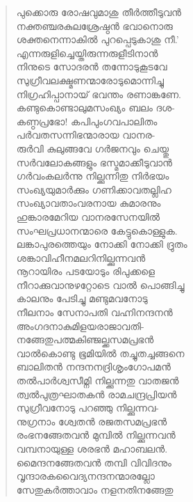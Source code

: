 \begin{verse}
പുക്കൊരു രോഷവുമാശു തീര്‍ത്തീടുവന്‍\\
നക്തഞ്ചരകുലശ്രേഷ്ഠന്‍ ഭവാനൊരു\\
ശക്തനെന്നാകില്‍ പുറപ്പെടുകാശു നീ.’\\
എന്നരുളിച്ചെയ്തിരുന്നരുളീടിനാന്‍\\
നിനുടെ സോദരന്‍ തന്നോടുകൂടവേ\\
സുഗ്രീവലക്ഷ്മണന്മാരോടുമൊന്നിച്ചു\\
നിഗ്രഹിപ്പാനായ് ഭവന്തം രണാങ്കണേ.\\
കണ്ടുകൊണ്ടാലുമസംഖ്യം ബലം ദശ-\\
കണ്ഠപ്രഭോ! കപിപുംഗവപാലിതം\\
പര്‍വതസന്നിഭന്മാരായ വാനര-\\
രുര്‍വി കുലുങ്ങവേ ഗര്‍ജനവും ചെയ്തു\\
സര്‍വലോകങ്ങളും ഭസ്മമാക്കീടുവാന്‍\\
ഗര്‍വംകലര്‍ന്നു നില്ക്കുന്നിതു നിര്‍ഭയം\\
സംഖ്യയുമാര്‍ക്കും ഗണിക്കാവതല്ലിഹ\\
സംഖ്യാവതാംവരനായ കുമാരനും\\
ഹുങ്കാരമേറിയ വാനരസേനയില്‍\\
സംഘപ്രധാനന്മാരെ കേട്ടുകൊള്ളുക.\\
ലങ്കാപുരത്തെയും നോക്കി നോക്കി ദ്രുതം\\
ശങ്കാവിഹീനമലറിനില്ക്കുന്നവന്‍\\
നൂറായിരം പടയോടും രിപുക്കളെ\\
നീറാക്കുവാനുഴറ്റോടെ വാല്‍ പൊങ്ങിച്ചു\\
കാലനും പേടിച്ചു മണ്ടുമവനോടു\\
നീലനാം സേനാപതി വഹ്നിനന്ദനന്‍\\
അംഗദനാകുമിളയരാജാവതി-\\
നങ്ങേതുപത്മകിഞ്ജല്ക്കസമപ്രഭന്‍\\
വാല്‍കൊണ്ടു ഭൂമിയില്‍ തച്ചുതച്ചങ്ങനെ\\
ബാലിതന്‍ നന്ദനനദ്രിശൃംഗോപമന്‍\\
തല്‍പാര്‍ശ്വസീമ്നി നില്ക്കുന്നതു വാതജന്‍\\
ത്വല്‍പുത്രഘാതകന്‍ രാമചന്ദ്രപ്രിയന്‍\\
സുഗ്രീവനോടു പറഞ്ഞു നില്ക്കുന്നവ-\\
നുഗ്രനാം ശ്വേതന്‍ രജതസമപ്രഭന്‍\\
രംഭനങ്ങേതവന്‍ മുമ്പില്‍ നില്ക്കുന്നവന്‍\\
വമ്പനായുള്ള ശരഭന്‍ മഹാബലന്‍.\\
മൈന്ദനങ്ങേതവന്‍ തമ്പി വിവിദനും\\
വൃന്ദാരകവൈദ്യനന്ദനന്മാരല്ലോ\\
സേതുകര്‍ത്താവാം നളനതിനങ്ങേതു\\

\end{verse}
